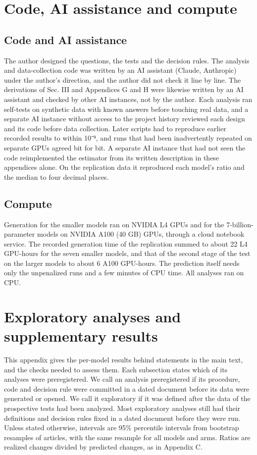 \documentclass[aps,prx,onecolumn,superscriptaddress,longbibliography]{revtex4-2}
\begin{document}
\section{Code, AI assistance and compute}

\subsection{Code and AI assistance}

The author designed the questions, the tests and the decision rules. The analysis and data-collection code was written by an AI assistant (Claude, Anthropic) under the author's direction, and the author did not check it line by line. The derivations of Sec. III and Appendices G and H were likewise written by an AI assistant and checked by other AI instances, not by the author. Each analysis ran self-tests on synthetic data with known answers before touching real data, and a separate AI instance without access to the project history reviewed each design and its code before data collection. Later scripts had to reproduce earlier recorded results to within 10⁻⁹, and runs that had been inadvertently repeated on separate GPUs agreed bit for bit. A separate AI instance that had not seen the code reimplemented the estimator from its written description in these appendices alone. On the replication data it reproduced each model's ratio and the median to four decimal places.

\subsection{Compute}

Generation for the smaller models ran on NVIDIA L4 GPUs and for the 7-billion-parameter models on NVIDIA A100 (40 GB) GPUs, through a cloud notebook service. The recorded generation time of the replication summed to about 22 L4 GPU-hours for the seven smaller models, and that of the second stage of the test on the larger models to about 6 A100 GPU-hours. The prediction itself needs only the unpenalized runs and a few minutes of CPU time. All analyses ran on CPU.

\section{Exploratory analyses and supplementary results}

This appendix gives the per-model results behind statements in the main text, and the checks needed to assess them. Each subsection states which of its analyses were preregistered. We call an analysis preregistered if its procedure, code and decision rule were committed in a dated document before its data were generated or opened. We call it exploratory if it was defined after the data of the prospective tests had been analyzed. Most exploratory analyses still had their definitions and decision rules fixed in a dated document before they were run. Unless stated otherwise, intervals are 95\% percentile intervals from bootstrap resamples of articles, with the same resample for all models and arms. Ratios are realized changes divided by predicted changes, as in Appendix C.
\end{document}
